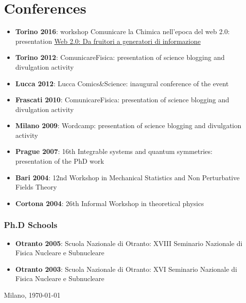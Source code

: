 \documentclass[a4paper]{article}
\begin{document}
\section{Conferences}
\begin{itemize}
	\item {\bf Torino 2016}: workshop Comunicare la Chimica nell'epoca del web 2.0: presentation \href{http://dropseaofulaula.blogspot.it/2016/09/web-20-da-fruitori-generatori-di.html}{Web 2.0: Da fruitori a generatori di informazione}
	\item {\bf Torino 2012}: ComunicareFisica: presentation of science blogging and divulgation activity
	\item {\bf Lucca 2012}: Lucca Comics\&Science: inaugural conference of the event 
	\item {\bf Frascati 2010}: ComunicareFisica: presentation of science blogging and divulgation activity
	\item {\bf Milano 2009}: Wordcamp: presentation of science blogging and divulgation activity
	\item {\bf Prague 2007}: 16th Integrable systems and quantum symmetries: presentation of the PhD work
	\item {\bf Bari 2004}: 12nd Workshop in Mechanical Statistics and Non Perturbative Fields Theory
	\item {\bf Cortona 2004}: 26th Informal Workshop in theoretical physics
\end{itemize}
\subsubsection*{Ph.D Schools}
\begin{itemize}
	\item {\bf Otranto 2005}: Scuola Nazionale di Otranto: XVIII Seminario Nazionale di Fisica Nucleare e Subnucleare
	\item {\bf Otranto 2003}: Scuola Nazionale di Otranto: XVI Seminario Nazionale di Fisica Nucleare e Subnucleare
\end{itemize}
%
%
%
\vspace{2\baselineskip}
\noindent Milano, \today
\end{document}
